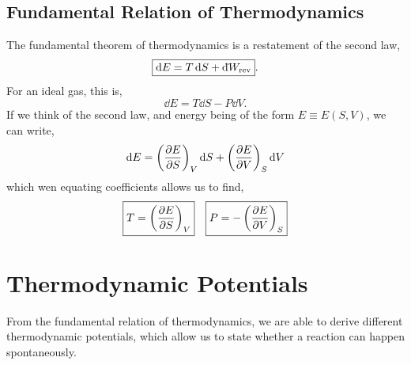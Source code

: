 \documentclass{book}
\newcommand{\dbar}{\mathrm{d}\hspace*{-0.08em}\bar{}\hspace*{0.1em}}
\begin{document}
\subsection{Fundamental Relation of Thermodynamics}
The fundamental theorem of thermodynamics is a restatement of the second law,
\begin{equation}
	\boxed{\dd{E} = T\dd{S} + \dbar W_{\text{rev}}}.
\end{equation}
For an ideal gas, this is,
\begin{equation}
	\dd{E} = T \dd{S} - P\dd{V}.
\end{equation}
If we think of the second law, and energy being of the form $E \equiv E(S,V)$, we can write,
\begin{equation}
	\dd{E} = \left(\pdv{E}{S}\right)_V \dd{S} + \left(\pdv{E}{V}\right)_S \dd{V}
\end{equation}
which wen equating coefficients allows us to find,
\begin{align}
	\boxed{T = \left(\pdv{E}{S}\right)_V } && \boxed{P = -  \left(\pdv{E}{V}\right)_S}
\end{align}
\section{Thermodynamic Potentials}
From the fundamental relation of thermodynamics, we are able to derive different thermodynamic potentials, which allow us to state whether a reaction can happen spontaneously. 
\end{document}
